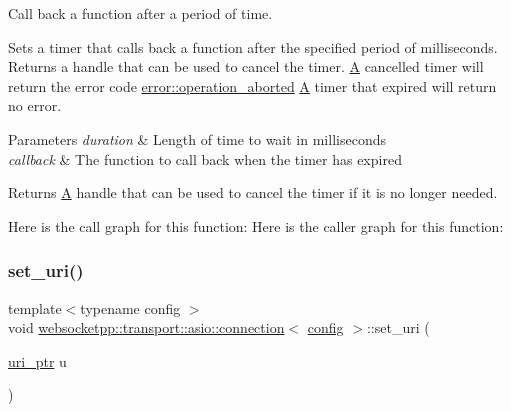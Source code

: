 Call back a function after a period of time. 

Sets a timer that calls back a function after the specified period of milliseconds. Returns a handle that can be used to cancel the timer. \mbox{\hyperlink{struct_a}{A}} cancelled timer will return the error code \mbox{\hyperlink{namespacewebsocketpp_1_1transport_1_1error_a8d371a2562d813e5a2e106e2694d4fb0a887436887a8732e48f7c67bd85bb6f64}{error\+::operation\+\_\+aborted}} \mbox{\hyperlink{struct_a}{A}} timer that expired will return no error.


\begin{DoxyParams}{Parameters}
{\em duration} & Length of time to wait in milliseconds\\
\hline
{\em callback} & The function to call back when the timer has expired\\
\hline
\end{DoxyParams}
\begin{DoxyReturn}{Returns}
\mbox{\hyperlink{struct_a}{A}} handle that can be used to cancel the timer if it is no longer needed. 
\end{DoxyReturn}
Here is the call graph for this function\+:
Here is the caller graph for this function\+:
\mbox{\label{classwebsocketpp_1_1transport_1_1asio_1_1connection_abe1def82c2be645adfc9f769aafb1a0d}} 
\subsubsection{\texorpdfstring{set\+\_\+uri()}{set\_uri()}}
{\footnotesize\ttfamily template$<$typename config $>$ \\
void \mbox{\hyperlink{classwebsocketpp_1_1transport_1_1asio_1_1connection}{websocketpp\+::transport\+::asio\+::connection}}$<$ \mbox{\hyperlink{classconfig}{config}} $>$\+::set\+\_\+uri (\begin{DoxyParamCaption}\item[{\mbox{\hyperlink{namespacewebsocketpp_aae370ea5ac83a8ece7712cb39fc23f5b}{uri\+\_\+ptr}}}]{u }\end{DoxyParamCaption})\hspace{0.3cm}{\ttfamily [inline]}}



